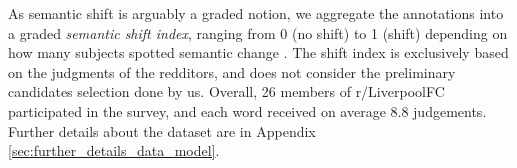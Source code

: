 As semantic shift is arguably a graded notion, we 
aggregate the annotations into a graded \emph{semantic shift index},
ranging from 0 (no shift) to 1 (shift) depending on how many subjects
spotted semantic change \cite{KutuzovEtal-coling2018}. The shift index is exclusively based
  on the judgments of the redditors, and does not consider the
  preliminary candidates selection done by us.  Overall, 26 members
of r/LiverpoolFC participated in the survey, and each word received on
average 8.8 judgements. 
  Further details about the dataset are in Appendix \ref{sec:further_details_data_model}. 



